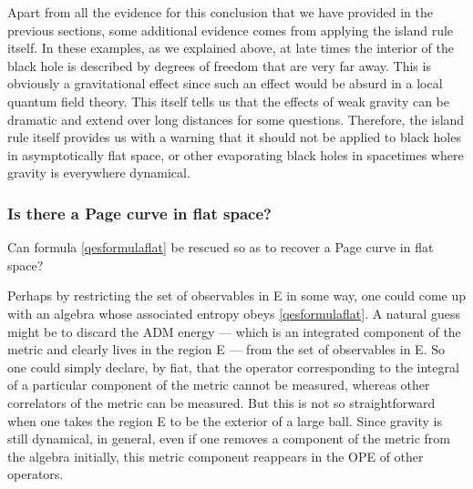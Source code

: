 \documentclass[12pt]{article}
\begin{document}
Apart from all the evidence for this conclusion that we have provided in the previous sections,  some additional evidence comes from applying the island rule itself. In these examples, as we explained above, at late times the  interior of the black hole is described by degrees of freedom that are very far away.  This is obviously a gravitational effect since such an effect would be absurd in a local quantum field theory. This itself tells us that the effects of weak gravity can be dramatic and extend over long distances for some questions.  Therefore, the island rule itself provides us with a warning that it should not be applied to black holes in asymptotically flat space, or other evaporating black holes in spacetimes  where gravity is everywhere dynamical.

\subsubsection{Is there a Page curve in flat space? \label{secispageflat}}
Can formula \eqref{qesformulaflat} be rescued so as to recover a Page curve in flat space?

Perhaps by restricting the set of observables in E in some way, one could come up with an algebra whose associated entropy obeys \eqref{qesformulaflat}. A natural guess might be to discard the ADM energy  --- which is an integrated component of the metric and clearly lives in the region E --- from the set of observables in E. So one could simply declare, by fiat, that the operator corresponding to the integral of a particular component of the metric cannot be measured, whereas other correlators of the metric can be measured.  But this is not so straightforward when one takes the region E to be the exterior of a large ball. Since gravity is still dynamical, in general, even if one removes a component of the metric from the algebra initially, this metric component reappears in the OPE of other operators. 
\end{document}

